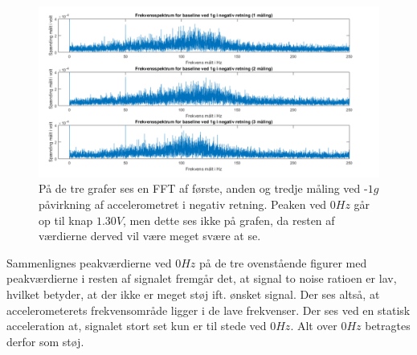\begin{figure}[H]
	\centering
	\includegraphics[scale=0.5]{figures/cProblemloesning/Pilotforsoeg_FrekvensN.png}
	\caption{På de tre grafer ses en FFT af første, anden og tredje måling ved -$1g$ påvirkning af accelerometret i negativ retning. Peaken ved $0Hz$ går op til knap $1.30V$, men dette ses ikke på grafen, da resten af værdierne derved vil være meget svære at se.}
	\label{Fig:Pilot_FFTN}
\end{figure}

\noindent Sammenlignes peakværdierne ved $0Hz$ på de tre ovenstående figurer med peakværdierne i resten af signalet fremgår det, at signal to noise ratioen er lav, hvilket betyder, at der ikke er meget støj ift. ønsket signal. Der ses altså, at accelerometerets frekvensområde ligger i de lave frekvenser. Der ses ved en statisk acceleration at, signalet stort set kun er til stede ved $0Hz$. Alt over $0Hz$ betragtes derfor som støj. 

